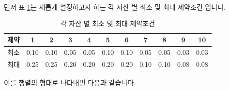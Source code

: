\documentclass[12pt,]{book}
\begin{document}
먼저 표 \ref{tab:assetconst}는 새롭게 설정하고자 하는 각 자산 별 최소 및 최대 제약조건 입니다.

\begin{table}[!h]

\caption{\label{tab:assetconst}각 자산 별 최소 및 최대 제약조건}
\centering
\begin{tabular}{ccccccccccc}
\toprule
제약 & 1 & 2 & 3 & 4 & 5 & 6 & 7 & 8 & 9 & 10\\
\midrule
\rowcolor{gray!6}  최소 & 0.10 & 0.10 & 0.05 & 0.05 & 0.10 & 0.10 & 0.05 & 0.05 & 0.03 & 0.03\\
최대 & 0.25 & 0.25 & 0.20 & 0.20 & 0.20 & 0.20 & 0.10 & 0.10 & 0.08 & 0.08\\
\bottomrule
\end{tabular}
\end{table}

이를 행렬의 형태로 나타내면 다음과 같습니다.
\end{document}

